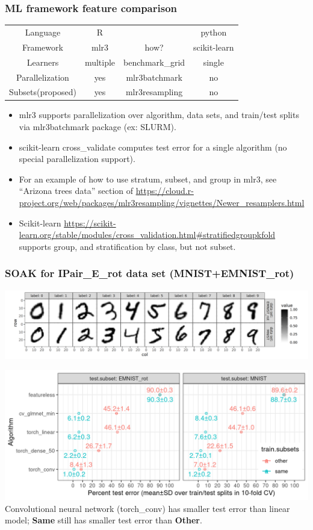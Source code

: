 \documentclass[t]{beamer}
\begin{document}
\begin{frame}[fragile]
  \frametitle{ML framework feature comparison}

  \begin{tabular}{cccc}
    Language & R& & python   \\
    Framework & mlr3& how? &  scikit-learn \\
    \hline
    Learners & multiple & benchmark\_grid & single \\
    Parallelization & yes & mlr3batchmark & no   \\
    Subsets(proposed) & yes & mlr3resampling & no  \\
  \end{tabular}

  \begin{itemize}
  \item mlr3 supports parallelization over algorithm, data sets, and
    train/test splits via mlr3batchmark package (ex: SLURM).
  \item scikit-learn cross\_validate computes test error for a single algorithm (no special parallelization support).
  \item
  For an example of how to use stratum, subset, and group in mlr3, see ``Arizona trees data'' section of
  \url{https://cloud.r-project.org/web/packages/mlr3resampling/vignettes/Newer_resamplers.html}
  \item 
  Scikit-learn
  \url{https://scikit-learn.org/stable/modules/cross_validation.html#stratifiedgroupkfold}
  supports group, and stratification by class, but not subset.
  \end{itemize}
\end{frame}

\begin{frame}
  \frametitle{SOAK for IPair\_E\_rot data set (MNIST+EMNIST\_rot)}

  \includegraphics[width=\textwidth]{data_Classif_MNIST_other_EMNIST_rot.png}

  \includegraphics[width=\textwidth]{conv_images_figures_same_other.png}
  Convolutional neural network (torch\_conv) has smaller test error than linear model; \textbf{Same} still has smaller test error than \textbf{Other}.
\end{frame}


  
\end{document}
